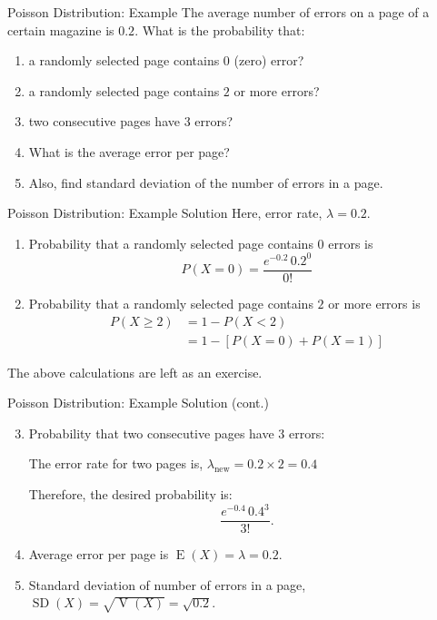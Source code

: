 \documentclass[12pt, aspectratio=169]{beamer}
\DeclareMathOperator{\E}{E}
\DeclareMathOperator{\V}{V}
\begin{document}
	\begin{frame}{Poisson Distribution: Example}
		The average number of errors on a page of a certain magazine is $0.2$. What is the probability that:
		\begin{enumerate}
			\item a randomly selected page contains $0$ (zero) error?
			\item a randomly selected page contains $2$ or more errors?
			\item two consecutive pages have $3$ errors?
			\item What is the average error per page?
			\item Also, find standard deviation of the number of errors in a page.
		\end{enumerate}
	\end{frame}


	\begin{frame}{Poisson Distribution: Example Solution}
		Here, error rate, \(\lambda = 0.2\).
		\begin{enumerate}
			\item Probability that a randomly selected page contains $0$ errors is 
			\[
				P(X=0) = \frac{e^{-0.2} \, 0.2^0}{0!}
			\]
			\item Probability that a randomly selected page contains $2$ or more errors is
			\begin{align*}
				P(X \geqslant 2) &= 1 - P(X < 2) \\
				&= 1 - [P(X=0) + P(X=1)]
			\end{align*}
		\end{enumerate}
		The above calculations are left as an exercise.
	\end{frame}


	\begin{frame}{Poisson Distribution: Example Solution (cont.)}
		
		\begin{enumerate}
			\setcounter{enumi}{2}
			\item Probability that two consecutive pages have $3$ errors:
			
			\vspace{0.25em}
			
			The error rate for two pages is, \(\lambda_{\mathrm{new}} = 0.2 \times 2 = 0.4\)

			\vspace{0.25em}

			Therefore, the desired probability is:
			\[
				\frac{e^{-0.4} \, 0.4^3}{3!}.
			\]

			\item Average error per page is \(\E(X) = \lambda = 0.2\).
			\item Standard deviation of number of errors in a page, \(\operatorname{SD}(X) = \sqrt{\V(X)} = \sqrt{0.2}\).
		\end{enumerate}
	\end{frame}
\end{document}
